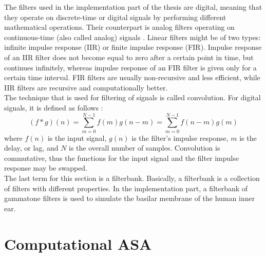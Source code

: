 The filters used in the implementation part of the thesis are digital, meaning that they ope\-rate on discrete-time or digital signals by performing different mathematical operations. Their counterpart is analog filters operating on continuous-time (also called analog) signals \cite{Shenoi2005}. Linear filters might be of two types: infinite impulse response (IIR) or finite impulse response (FIR). Impulse response of an IIR filter does not become equal to zero after a certain point in time, but continues infinitely, whereas impulse response of an FIR filter is given only for a certain time interval. FIR filters are usually non-recursive and less efficient, while IIR filters are recursive and computationally better.\\

The technique that is used for filtering of signals is called convolution. For digital signals, it is defined as follows \cite{Schnupp2011}:
\begin{equation}
	(f*g)(n) = \sum_{m=0}^{N-1}f(m)g(n - m) = \sum_{m=0}^{N-1}f(n - m)g(m)
\end{equation}
where $f(n)$ is the input signal, $g(n)$ is the filter's impulse response, $m$ is the delay, or lag, and $N$ is the overall number of samples. Convolution is commutative, thus the functions for the input signal and the filter impulse response may be swapped.\\

The last term for this section is a filterbank. Basically, a filterbank is a collection of filters with different properties. In the implementation part, a filterbank of gammatone filters is used to simulate the basilar membrane of the human inner ear.

\section{Computational ASA}\label{chapter:casa}

